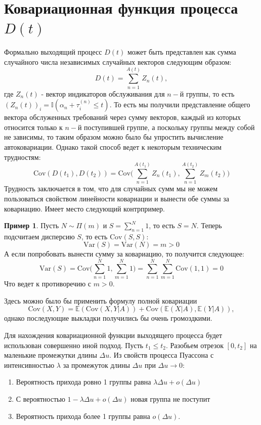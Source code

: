 \documentclass[12pt]{article}
\theoremstyle{plain}
\theoremstyle{definition}
\newtheorem{example}{Пример}[section]
\theoremstyle{remark}
\begin{document}
\section{Ковариационная функция процесса $D(t)$}

Формально выходящий процесс $D(t)$ может быть представлен как сумма случайного числа независимых случайных векторов следующим образом:
\[
    D(t) = \sum_{n=1}^{A(t)}Z_n(t),
\]
где $Z_n(t)$ - вектор индикаторов обслуживания для $n-$й группы, то есть $(Z_n(t))_i = \mathbb{I}(\alpha_n + \tau_i^{(n)} \le t)$. То есть мы получили представление общего вектора обслуженных требований через сумму векторов, каждый из которых относится только к $n-$й поступившей группе, а поскольку группы между собой не зависимы, то таким образом можно было бы упростить вычисление автоковариации. Однако такой способ ведет к некоторым техническим трудностям:
\[
    \mathrm{Cov}(D(t_1), D(t_2)) = \mathrm{Cov}\bigg(\sum_{n=1}^{A(t_1)}Z_n(t_1), \sum_{n=1}^{A(t_2)}Z_m(t_2)\bigg)
\]
Трудность заключается в том, что для случайных сумм мы не можем пользоваться свойством линейности ковариации и вынести обе суммы за ковариацию. Имеет место следующий контрпример.
\begin{example}
    Пусть $N \sim \Pi(m)$ и $S = \sum_{n=1}^N 1$, то есть $S = N$. Теперь подсчитаем дисперсию $S$, то есть $\mathrm{Cov}(S, S)$:
    \[
        \mathrm{Var}(S) = \mathrm{Var}(N) = m > 0
    \]
    А если попробовать вынести сумму за ковариацию, то получится следующее:
    \[
        \mathrm{Var}(S) = \mathrm{Cov}\bigg(\sum_{n=1}^N 1, \sum_{m=1}^N 1 \bigg) = \sum_{n=1}^N\sum_{m=1}^N\mathrm{Cov}(1, 1) = 0
    \]
    Что ведет к противоречию с $m > 0$.
\end{example}

Здесь можно было бы применить формулу полной ковариации
\[
    \mathrm{Cov}(X, Y) = \mathbb{E}(\mathrm{Cov}(X, Y | A)) + \mathrm{Cov}(\mathbb{E}(X | A), \mathbb{E}(Y | A)),
\]
однако последующие выкладки получились бы очень громоздкими. 

Для нахождения ковариационной функции выходящего процесса будет использован совершенно иной подход. Пусть $t_1 \le t_2$. Разобьем отрезок $[0, t_2]$ на маленькие промежутки длины $\Delta u$. Из свойств процесса Пуассона с интенсивностью $\lambda$ за промежуток длины $\Delta u$ при $\Delta u \to 0$:
\begin{enumerate}
    \item Вероятность прихода ровно 1 группы равна $\lambda \Delta u + o(\Delta u)$
    \item С вероятностью $1 - \lambda \Delta u + o(\Delta u)$ новая группа не поступит
    \item Вероятность прихода более 1 группы равна $o(\Delta u)$.
\end{enumerate}
\end{document}
